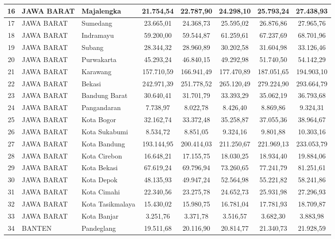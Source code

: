 \begin{spacing}{1.0}
\begin{longtable}{|c|p{2.2cm}|p{2.8cm}|c|c|c|c|c|}
16 & JAWA BARAT & Majalengka & 21.754,54 & 22.787,90 & 24.298,10 & 25.793,24 & 27.438,93 \\ \hline
17 & JAWA BARAT & Sumedang & 23.665,01 & 24.368,73 & 25.595,02 & 26.876,86 & 27.965,76 \\ \hline
18 & JAWA BARAT & Indramayu & 59.200,00 & 59.544,87 & 61.259,61 & 67.237,69 & 68.701,96 \\ \hline
19 & JAWA BARAT & Subang & 28.344,32 & 28.960,89 & 30.202,58 & 31.604,98 & 33.126,46 \\ \hline
20 & JAWA BARAT & Purwakarta & 45.293,24 & 46.840,15 & 49.292,98 & 51.740,50 & 54.142,29 \\ \hline
21 & JAWA BARAT & Karawang & 157.710,59 & 166.941,49 & 177.470,89 & 187.051,65 & 194.903,10 \\ \hline
22 & JAWA BARAT & Bekasi & 242.971,39 & 251.778,52 & 265.120,49 & 279.224,90 & 293.664,79 \\ \hline
23 & JAWA BARAT & Bandung Barat & 30.640,41 & 31.701,79 & 33.393,29 & 35.062,19 & 36.793,68 \\ \hline
24 & JAWA BARAT & Pangandaran & 7.738,97 & 8.022,78 & 8.426,40 & 8.869,86 & 9.324,31 \\ \hline
25 & JAWA BARAT & Kota Bogor & 32.162,74 & 33.372,48 & 35.258,87 & 37.055,36 & 38.964,67 \\ \hline
26 & JAWA BARAT & Kota Sukabumi & 8.534,72 & 8.851,05 & 9.324,16 & 9.801,88 & 10.303,16 \\ \hline
27 & JAWA BARAT & Kota Bandung & 193.144,95 & 200.414,03 & 211.250,67 & 221.969,13 & 233.053,79 \\ \hline
28 & JAWA BARAT & Kota Cirebon & 16.648,21 & 17.155,75 & 18.030,25 & 18.934,40 & 19.884,06 \\ \hline
29 & JAWA BARAT & Kota Bekasi & 67.619,24 & 69.796,94 & 73.260,65 & 77.241,79 & 81.251,61 \\ \hline
30 & JAWA BARAT & Kota Depok & 48.135,93 & 49.947,24 & 52.564,98 & 55.221,82 & 58.241,86 \\ \hline
31 & JAWA BARAT & Kota Cimahi & 22.340,56 & 23.275,78 & 24.652,73 & 25.931,98 & 27.296,93 \\ \hline
32 & JAWA BARAT & Kota Tasikmalaya & 15.430,02 & 15.980,75 & 16.781,04 & 17.781,93 & 18.709,87 \\ \hline
33 & JAWA BARAT & Kota Banjar & 3.251,76 & 3.371,78 & 3.516,57 & 3.682,30 & 3.883,98 \\ \hline
34 & BANTEN & Pandeglang & 19.511,68 & 20.116,90 & 20.814,77 & 21.340,73 & 21.928,59 \\ \hline

\end{longtable}
\end{spacing}
